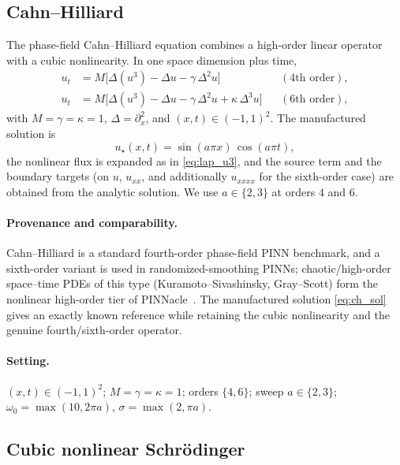\subsection{Cahn--Hilliard}\label{sec:bm:ch}

The phase-field Cahn--Hilliard equation combines a high-order linear operator
with a cubic nonlinearity. In one space dimension plus time,
\begin{align}\label{eq:ch_pde}
  u_t &= M\big[\Delta(u^3) - \Delta u - \gamma\,\Delta^2 u\big] && (\text{4th order}),\\
  u_t &= M\big[\Delta(u^3) - \Delta u - \gamma\,\Delta^2 u + \kappa\,\Delta^3 u\big] && (\text{6th order}),
  \label{eq:ch_pde6}
\end{align}
with \(M = \gamma = \kappa = 1\), \(\Delta = \partial_x^2\), and
\((x,t) \in (-1,1)^2\). The manufactured solution is
\begin{equation}\label{eq:ch_sol}
  u_\star(x,t) = \sin(a\pi x)\,\cos(a\pi t),
\end{equation}
the nonlinear flux is expanded as in \eqref{eq:lap_u3}, and the source term and
the boundary targets (on \(u\), \(u_{xx}\), and additionally \(u_{xxxx}\) for the
sixth-order case) are obtained from the analytic solution. We use
\(a \in \{2,3\}\) at orders \(4\) and \(6\).

\paragraph{Provenance and comparability.}
Cahn--Hilliard is a standard fourth-order phase-field PINN benchmark, and a
sixth-order variant is used in randomized-smoothing PINNs; chaotic/high-order
space--time PDEs of this type (Kuramoto--Sivashinsky, Gray--Scott) form the
nonlinear high-order tier of PINNacle~\cite{Hao2024PINNacle}. The manufactured
solution \eqref{eq:ch_sol} gives an exactly known reference while retaining the
cubic nonlinearity and the genuine fourth/sixth-order operator.

\paragraph{Setting.}
\((x,t)\in(-1,1)^2\); \(M=\gamma=\kappa=1\); orders \(\{4,6\}\); sweep
\(a\in\{2,3\}\); \(\omega_0=\max(10,2\pi a)\), \(\sigma=\max(2,\pi a)\).

\subsection{Cubic nonlinear Schr\"odinger}\label{sec:bm:nls}

